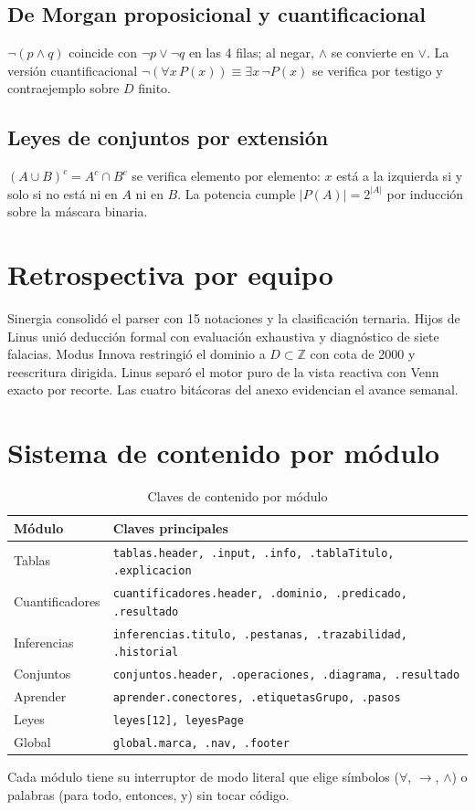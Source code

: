\documentclass[11pt,a4paper,openany]{book}
\begin{document}
\section{De Morgan proposicional y cuantificacional}
$\lnot(p \land q)$ coincide con $\lnot p \lor \lnot q$ en las 4 filas; al negar, $\land$ se convierte en $\lor$. La versi\'on cuantificacional $\lnot(\forall x\,P(x)) \equiv \exists x\,\lnot P(x)$ se verifica por testigo y contraejemplo sobre $D$ finito.
\section{Leyes de conjuntos por extensi\'on}
$(A \cup B)^{c} = A^{c} \cap B^{c}$ se verifica elemento por elemento: $x$ est\'a a la izquierda si y solo si no est\'a ni en $A$ ni en $B$. La potencia cumple $|P(A)| = 2^{|A|}$ por inducci\'on sobre la m\'ascara binaria.

\chapter{Retrospectiva por equipo}
\label{ch:retro}
Sinergia consolid\'o el parser con 15 notaciones y la clasificaci\'on ternaria. Hijos de Linus uni\'o deducci\'on formal con evaluaci\'on exhaustiva y diagn\'ostico de siete falacias. Modus Innova restringi\'o el dominio a $D \subset \mathbb{Z}$ con cota de 2000 y reescritura dirigida. Linus separ\'o el motor puro de la vista reactiva con Venn exacto por recorte. Las cuatro bit\'acoras del anexo evidencian el avance semanal.


\chapter{Sistema de contenido por m\'odulo}
\label{ch:content-det}
\begin{table}[H]
\centering
\caption{Claves de contenido por m\'odulo}
\begin{tabular}{ll}
\toprule
M\'odulo & Claves principales \\
\midrule
Tablas & \texttt{tablas.header, .input, .info, .tablaTitulo, .explicacion} \\
Cuantificadores & \texttt{cuantificadores.header, .dominio, .predicado, .resultado} \\
Inferencias & \texttt{inferencias.titulo, .pestanas, .trazabilidad, .historial} \\
Conjuntos & \texttt{conjuntos.header, .operaciones, .diagrama, .resultado} \\
Aprender & \texttt{aprender.conectores, .etiquetasGrupo, .pasos} \\
Leyes & \texttt{leyes[12], leyesPage} \\
Global & \texttt{global.marca, .nav, .footer} \\
\bottomrule
\end{tabular}
\end{table}
Cada m\'odulo tiene su interruptor de modo literal que elige s\'imbolos ($\forall$, $\to$, $\land$) o palabras (para todo, entonces, y) sin tocar c\'odigo.
\end{document}
